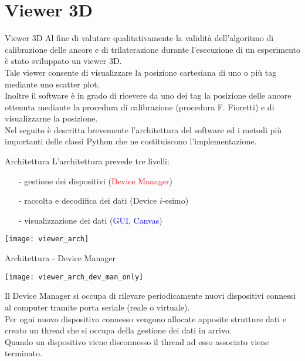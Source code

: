 \section{Viewer 3D}

\begin{frame}{Viewer 3D}
  Al fine di valutare \alert{qualitativamente} la validità dell'algoritmo di calibrazione delle ancore e di trilaterazione
  durante l'esecuzione di un esperimento è stato sviluppato un viewer 3D.\\
  Tale viewer consente di visualizzare la posizione cartesiana di uno o più tag
  mediante uno scatter plot.\\
  Inoltre il software è in grado di ricevere da uno dei tag la posizione delle ancore ottenuta
  mediante la procedura di calibrazione (procedura F. Fioretti) e di visualizzarne la posizione.\\
  Nel seguito è descritta brevemente l'architettura del software ed i metodi più importanti delle classi Python che ne
  costituiscono l'implementazione.
\end{frame}

\begin{frame}{Architettura}
  L'architettura prevede tre livelli:
  \begin{itemize}
  \item[-] gestione dei dispositivi (\textcolor{red}{Device Manager})
  \item[-] raccolta e decodifica dei dati (\textcolor{dgreen}{Device $i$-esimo})
  \item[-] visualizzazione dei dati (\textcolor{blue}{GUI, Canvas})
  \end{itemize}
  \texttt{[image: viewer\_arch]}
\end{frame}

\begin{frame}[shrink=10]{Architettura - Device Manager}
  \begin{center}
    \texttt{[image: viewer\_arch\_dev\_man\_only]}
  \end{center}
  Il Device Manager si occupa di rilevare periodicamente nuovi dispositivi connessi al computer tramite porta seriale
  (reale o virtuale).\\
  Per ogni nuovo dispositivo connesso vengono allocate apposite strutture dati e creato un thread che si occupa della gestione
  dei dati in arrivo.\\
  Quando un dispositivo viene disconnesso il thread ad esso associato viene terminato.
\end{frame}

